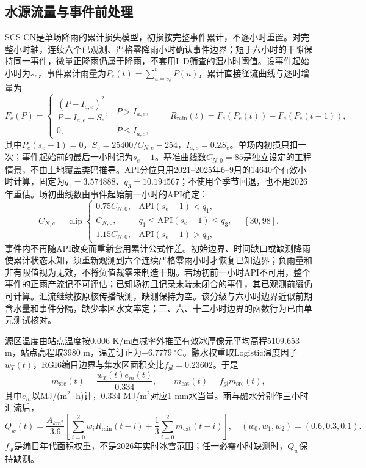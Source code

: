 \subsection{水源流量与事件前处理}
SCS-CN是单场降雨的累计损失模型，初损按完整事件累计，不逐小时重置\cite{hawkins2009}。对完整小时轴，连续六个已观测、严格零降雨小时确认事件边界；短于六小时的干隙保持同一事件，微量正降雨仍属于降雨，不套用I--D筛查的湿小时阈值。设事件起始小时为$s_e$，事件累计雨量为$P_e(t)=\sum_{u=s_e}^{t}P(u)$，累计直接径流曲线与逐时增量为
\begin{equation}
F_e(P)=
\begin{cases}
\dfrac{(P-I_{a,e})^2}{P-I_{a,e}+S_e},&P>I_{a,e},\\[2mm]
0,&P\le I_{a,e},
\end{cases}
\qquad
R_{\mathrm{rain}}(t)=F_e(P_e(t))-F_e(P_e(t-1)),
\label{eq:scs}
\end{equation}
其中$P_e(s_e-1)=0$，$S_e=25400/C_{N,e}-254$，$I_{a,e}=0.2S_e$。单场内初损只扣一次；事件起始前的最后一小时记为$s_e-1$。基准曲线数$C_{N,0}=85$是独立设定的工程情景，不由土地覆盖类码推导。API分位只用2021--2025年6--9月的14640个有效小时计算，固定为$q_1=3.574888$、$q_3=10.194567$；不使用全季节回退，也不用2026年重估。场初曲线数由事件起始前一小时的API确定：
\begin{equation}
C_{N,e}=\operatorname{clip}
\begin{cases}
0.75C_{N,0},&\mathrm{API}(s_e-1)<q_1,\\
C_{N,0},&q_1\le \mathrm{API}(s_e-1)\le q_3,\\
1.15C_{N,0},&\mathrm{API}(s_e-1)>q_3,
\end{cases}
\quad[30,98].
\end{equation}
事件内不再随API改变而重新套用累计公式作差。初始边界、时间缺口或缺测降雨使累计状态未知，须重新观测到六个连续严格零雨小时才恢复已知边界；负雨量和非有限值视为无效，不将负值裁零来制造干期。若场初前一小时API不可用，整个事件的正雨产流记不可评估；已知场初且记录末端未闭合的事件，其已观测前缀仍可计算。汇流继续按原核传播缺测，缺测保持为空。该分级与六小时边界近似前期含水量和事件分隔，缺少本区水文率定；三、六、十二小时边界的函数行为已由单元测试核对。

源区温度由站点温度按0.006 K/m直减率外推至有效冰厚像元平均高程5109.653 m，站点高程取3980 m，温差订正为$-6.7779\ ^\circ$C。融水权重取Logistic温度因子$w_T(t)$\cite{hock2005}，RGI6编目边界与集水区面积交比$f_{gl}=0.23602$。于是
\begin{equation}
m_{\mathrm{src}}(t)=\frac{w_T(t)e_m(t)}{0.334},\qquad
m_{\mathrm{cat}}(t)=f_{gl}m_{\mathrm{src}}(t),
\end{equation}
其中$e_m$以MJ/(m$^2\cdot$h)计，0.334 MJ/m$^2$对应1 mm水当量。雨与融水分别作三小时汇流后，
\begin{equation}
Q_w(t)=\frac{A_{km^2}}{3.6}\left[
\sum_{i=0}^{2}w_iR_{\mathrm{rain}}(t-i)
+\frac13\sum_{i=0}^{2}m_{\mathrm{cat}}(t-i)\right],
\quad
(w_0,w_1,w_2)=(0.6,0.3,0.1).
\label{eq:water}
\end{equation}
$f_{gl}$是编目年代面积权重，不是2026年实时冰雪范围；任一必需小时缺测时，$Q_w$保持缺测。


